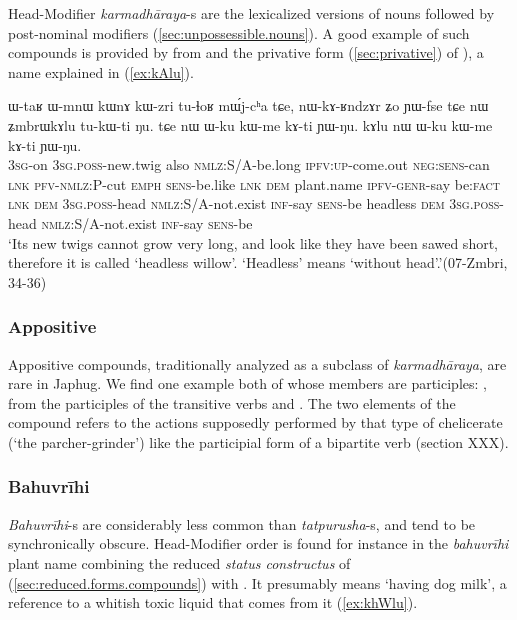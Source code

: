 Head-Modifier \textit{karmadhāraya}-s are the lexicalized versions of nouns followed by post-nominal modifiers (\ref{sec:unpossessible.nouns}). A good example of such compounds is provided by  from  and the privative form  (\ref{sec:privative}) of ), a name explained in (\ref{ex:kAlu}). 

\begin{exe}
\ex \label{ex:kAlu}  
\gll ɯ-taʁ ɯ-mnɯ kɯnɤ kɯ-zri tu-ɬoʁ mɯ́j-cʰa tɕe, nɯ-kɤ-ʁndzɤr ʑo ɲɯ-fse tɕe nɯ ʑmbrɯkɤlu tu-kɯ-ti ŋu. tɕe nɯ ɯ-ku kɯ-me kɤ-ti ɲɯ-ŋu.  kɤlu nɯ ɯ-ku kɯ-me kɤ-ti ɲɯ-ŋu.\\
\textsc{3sg}-on \textsc{3sg.poss}-new.twig also \textsc{nmlz}:S/A-be.long \textsc{ipfv}:\textsc{up}-come.out \textsc{neg:sens}-can \textsc{lnk} \textsc{pfv}-\textsc{nmlz}:P-cut \textsc{emph} \textsc{sens}-be.like \textsc{lnk} \textsc{dem} plant.name \textsc{ipfv}-\textsc{genr}-say be:\textsc{fact} \textsc{lnk}  \textsc{dem} \textsc{3sg.poss}-head \textsc{nmlz}:S/A-not.exist \textsc{inf}-say \textsc{sens}-be headless \textsc{dem} \textsc{3sg.poss}-head \textsc{nmlz}:S/A-not.exist \textsc{inf}-say \textsc{sens}-be\\
\glt `Its new twigs cannot grow very long, and look like they have been sawed short, therefore it is called `headless willow'. `Headless' means `without head'.'(07-Zmbri, 34-36)
\end{exe}

\subsubsection{Appositive} \label{sec:appositive.n.n}
Appositive compounds, traditionally analyzed as a subclass of \textit{karmadhāraya}, are rare in Japhug. We find one example both of whose members are participles: , from the  participles of the transitive verbs  and  . The two elements of the compound refers to the actions supposedly performed by that type of chelicerate (`the parcher-grinder') like the participial form of a bipartite verb (section XXX).


\subsubsection{Bahuvrīhi} \label{sec:bahuvrihi.n.n}
\textit{Bahuvrīhi}-s are considerably less common than \textit{tatpurusha}-s, and tend to be synchronically obscure. Head-Modifier order is found for instance in the \textit{bahuvrīhi} plant name   combining the reduced \textit{status constructus} of  (\ref{sec:reduced.forms.compounds}) with . It presumably means `having dog milk', a reference to a whitish toxic liquid that comes from it (\ref{ex:khWlu}).

